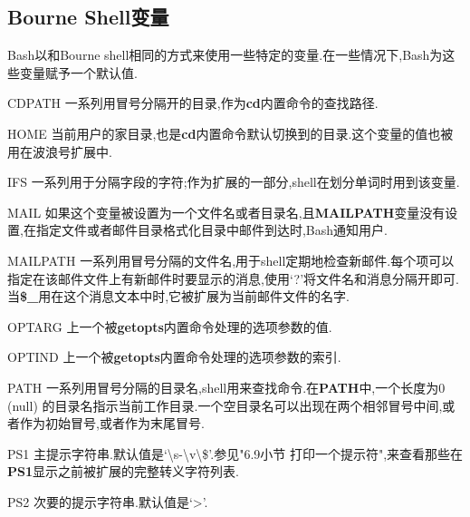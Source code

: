 \documentclass[draft,openany]{book}
\begin{document}
\begin{CJK}{UTF8}{gbsn}
    \section{Bourne Shell变量}
    Bash以和Bourne shell相同的方式来使用一些特定的变量.在一些情况下,Bash为这些变量赋予一个默认值.
    \begin{basedescript}{\desclabelstyle{\nextlinelabel}\desclabelwidth{2.5em}}
    \item[CDPATH] 一系列用冒号分隔开的目录,作为\textbf{cd}内置命令的查找路径.
    \item[HOME] 当前用户的家目录,也是\textbf{cd}内置命令默认切换到的目录.这个变量的值也被用在波浪号扩展中.
    \item[IFS] 一系列用于分隔字段的字符;作为扩展的一部分,shell在划分单词时用到该变量.
    \item[MAIL] 如果这个变量被设置为一个文件名或者目录名,且\textbf{MAILPATH}变量没有设置,在指定文件或者邮件目录格式化目录中邮件到达时,Bash通知用户.
    \item[MAILPATH] 一系列用冒号分隔的文件名,用于shell定期地检查新邮件.每个项可以指定在该邮件文件上有新邮件时要显示的消息,使用`?'将文件名和消息分隔开即可.当\textbf{\$\_}用在这个消息文本中时,它被扩展为当前邮件文件的名字.
    \item[OPTARG] 上一个被\textbf{getopts}内置命令处理的选项参数的值.
    \item[OPTIND] 上一个被\textbf{getopts}内置命令处理的选项参数的索引.
    \item[PATH] 一系列用冒号分隔的目录名,shell用来查找命令.在\textbf{PATH}中,一个长度为0 (null) 的目录名指示当前工作目录.一个空目录名可以出现在两个相邻冒号中间,或者作为初始冒号,或者作为末尾冒号.
    \item[PS1] 主提示字符串.默认值是`\textbackslash{}s-\textbackslash{}v\textbackslash{}\$'.参见"6.9小节 打印一个提示符",来查看那些在\textbf{PS1}显示之前被扩展的完整转义字符列表.
    \item[PS2] 次要的提示字符串.默认值是`\textgreater'.
    \end{basedescript}


\end{CJK}
\end{document}
